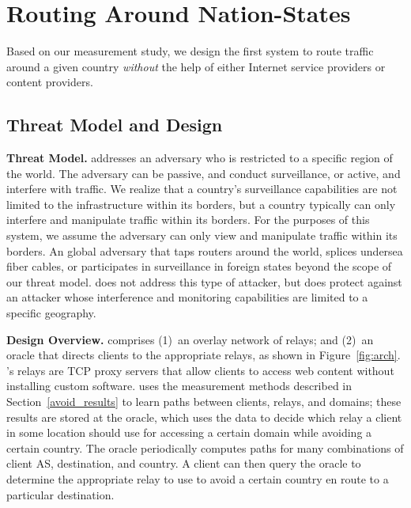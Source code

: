 \section{Routing Around Nation-States}
\label{system_design}


Based on our measurement study, we design the first system to route traffic
around a given country {\it without} the help of either Internet service
providers or content providers.  

\subsection{Threat Model and Design}


{\bf Threat Model.} \system{} addresses an adversary who is restricted to a specific region of the world.  The 
adversary can be passive, and conduct surveillance, or active, and interfere with traffic. We 
realize that a country's surveillance capabilities are not limited to the infrastructure within 
its borders, but a country typically can only interfere and manipulate traffic within its borders. 
For the purposes of this system, we assume the adversary can only view and manipulate traffic 
within its borders.
An global adversary that taps routers around the world, splices undersea fiber cables,
or participates in 
surveillance in foreign states beyond the scope of our threat model. \system{}
does not address this
type of attacker, but \system{} does protect against an attacker whose interference
and monitoring  capabilities are limited to a specific geography.



{\bf Design Overview.} \system{} comprises (1)~an overlay network of relays; and
(2)~an oracle that
directs clients to the appropriate relays, as shown in Figure~\ref{fig:arch}.
\system{}'s relays are TCP proxy servers that allow clients to access web
content without installing custom software. \system{} uses the measurement
methods described in Section~\ref{avoid_results} to learn paths between
clients, relays, and domains; these results are stored at the oracle, which
uses the data to decide which relay a client in some location should use for
accessing a certain domain while avoiding a certain country.  The oracle
periodically computes paths for many combinations of client AS, destination,
and country.   A client can then query the oracle to determine the appropriate
relay to use to avoid a certain country en route to a particular destination.

